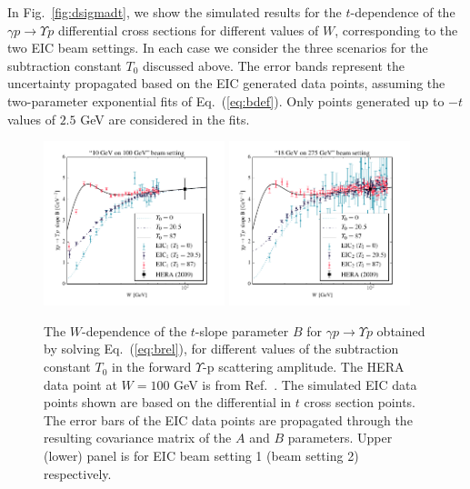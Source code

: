 \documentclass[prd,amsmath,%
twocolumn,floatfix,amssymb, preprintnumbers, linenumbers,nofootinbib, superscriptaddress]{revtex4}
\begin{document}
In Fig.~\ref{fig:dsigmadt}, we show the simulated results for the $t$-dependence of the $\gamma p \to \Upsilon p$ 
differential cross sections for different values of $W$,  
corresponding to the two EIC beam settings. In each case we consider the three scenarios for the subtraction constant $T_0$ discussed above. 
The error bands represent the uncertainty propagated based on the EIC generated data points, assuming the two-parameter exponential fits of Eq.~(\ref{eq:bdef}). 
Only points generated up to $-t$ values of $2.5$ GeV are considered in the fits.


\begin{figure}[h]
\includegraphics[width=0.47\textwidth]{b_slope_eic1.pdf}
\includegraphics[width=0.47\textwidth]{b_slope_eic2.pdf}
\caption{
The $W$-dependence of the $t$-slope parameter $B$ for $\gamma p \to \Upsilon p$ obtained by solving Eq.~(\ref{eq:brel}),
for different values of the subtraction constant $T_0$ in the forward $\Upsilon$-p scattering amplitude.
The HERA data point at $W=100$ GeV is from Ref.~\cite{Chekanov:2009zz}. 
The simulated EIC data points shown are based on the differential in $t$ cross section points. 
The error bars of the EIC data points are propagated through the resulting covariance matrix of the $A$ and $B$ parameters.
Upper (lower) panel is for EIC beam setting 1 (beam setting 2) respectively.}
\label{fig:bslopeeic}
\end{figure}
\end{document}
